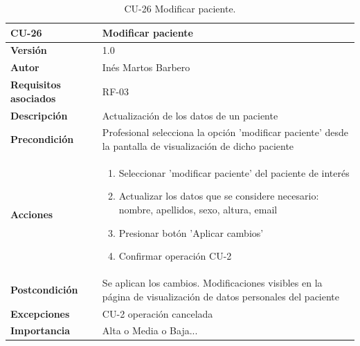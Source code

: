 \begin{table}[p]
	\centering
	\begin{tabularx}{\linewidth}{ p{} p{} }
		\toprule
		\textbf{CU-26}    & \textbf{Modificar paciente}\\
		\toprule
		\textbf{Versión}              & 1.0    \\
		\textbf{Autor}                & Inés Martos Barbero \\
		\textbf{Requisitos asociados} & RF-03 \\
		\textbf{Descripción}          & Actualización de los datos de un paciente \\
		\textbf{Precondición}         & Profesional selecciona la opción 'modificar paciente' desde la pantalla de visualización de dicho paciente \\
		\textbf{Acciones}             &
		\begin{enumerate}
			\def\labelenumi{\arabic{enumi}.}
			\tightlist
			\item Seleccionar 'modificar paciente' del paciente de interés
			\item Actualizar los datos que se considere necesario: nombre, apellidos, sexo, altura, email
            \item Presionar botón 'Aplicar cambios'
            \item Confirmar operación CU-2
		\end{enumerate}\\
		\textbf{Postcondición}        & Se aplican los cambios. Modificaciones visibles en la página de visualización de datos personales del paciente \\
		\textbf{Excepciones}          & CU-2 operación cancelada \\
		\textbf{Importancia}          & Alta o Media o Baja... \\
		\bottomrule
	\end{tabularx}
	\caption{CU-26 Modificar paciente.}
\end{table}

